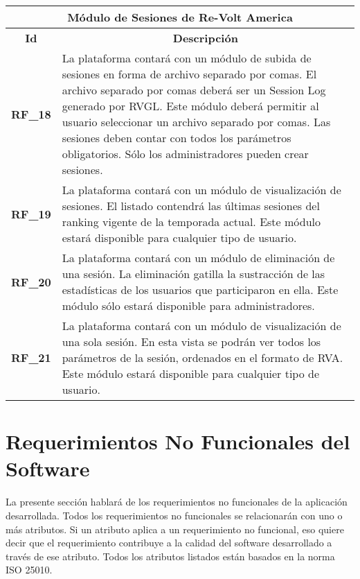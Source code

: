 \begin{center}
	\begin{tabular}{ | l | p{15cm} |}
		\hline
		\multicolumn{2}{|c|}{\textbf{Módulo de Sesiones de Re-Volt America}} \\
		\hline
		\multicolumn{1}{|c|}{\textbf{Id}} & \multicolumn{1}{|c|}{\textbf{Descripción}} \\
		\hline
		{\textbf{RF\_18}} & La plataforma contará con un módulo de subida de sesiones en forma de archivo separado por comas. El archivo separado por comas deberá ser un Session Log generado por RVGL. Este módulo deberá permitir al usuario seleccionar un archivo separado por comas. Las sesiones deben contar con todos los parámetros obligatorios. Sólo los administradores pueden crear sesiones. \\ \hline
		
		{\textbf{RF\_19}} & La plataforma contará con un módulo de visualización de sesiones. El listado contendrá las últimas sesiones del ranking vigente de la temporada actual. Este módulo estará disponible para cualquier tipo de usuario. \\ \hline
		
		{\textbf{RF\_20}} & La plataforma contará con un módulo de eliminación de una sesión. La eliminación gatilla la sustracción de las estadísticas de los usuarios que participaron en ella. Este módulo sólo estará disponible para administradores. \\ \hline
		
		{\textbf{RF\_21}} & La plataforma contará con un módulo de visualización de una sola sesión. En esta vista se podrán ver todos los parámetros de la sesión, ordenados en el formato de RVA. Este módulo estará disponible para cualquier tipo de usuario. \\ \hline
	\end{tabular}
  
  \label{table:rf:sessions}
\end{center}

\section{Requerimientos No Funcionales del Software}
La presente sección hablará de los requerimientos no funcionales de la aplicación desarrollada. Todos los requerimientos no funcionales se relacionarán con uno o más atributos. Si un atributo aplica a un requerimiento no funcional, eso quiere decir que el requerimiento contribuye a la calidad del software desarrollado a través de ese atributo. Todos los atributos listados están basados en la norma ISO 25010.

